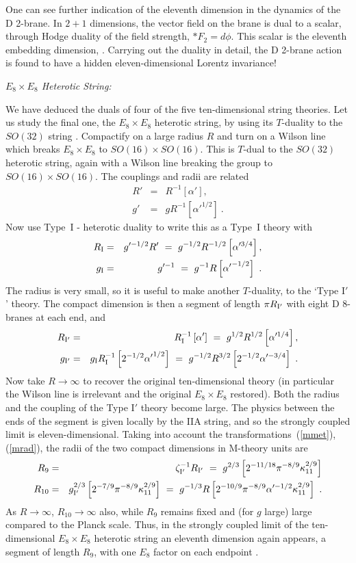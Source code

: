 \documentclass[12pt]{article}
\def\bea{\begin{eqnarray}}
\def\eea{\end{eqnarray}}
\def\ap{\alpha'}
\def\apm{\alpha'}
\begin{document}
One can see further indication of the eleventh dimension in the dynamics
of the D 2-brane.  In $2+1$ dimensions, the vector field on the brane is
dual to a scalar, through Hodge duality of the field strength, $*F_2 =
d\phi$.  This scalar is the eleventh embedding 
dimension\cite{duff11}, \cite{towndf}.
Carrying out the duality in detail, the D 2-brane action is found to have
a hidden eleven-dimensional Lorentz invariance!

{\it $E_8 \times E_8$ Heterotic String:}

We have deduced the duals of four of the five ten-dimensional string
theories.  Let us study the final one, the $E_8 \times E_8$ heterotic
string, by using its $T$-duality to the $SO(32)$ string \cite{narain}.
Compactify on a large radius $R$ and turn on a Wilson line which breaks
$E_8\times E_8$ to $SO(16) \times SO(16)$.  This is $T$-dual to the $SO(32)$
heterotic string, again with a Wilson line breaking the group to 
$SO(16) \times SO(16)$.  The couplings and radii are related
\bea
R' &=& R^{-1} \left[ \apm \right] , \nonumber\\
g' &=& g R^{-1} \left[ {\ap}^{1/2} \right] \ .
\eea
Now use Type~I - heterotic duality to write this as a Type~I theory
with \cite{wit}
\bea
R_{\rm I} &=& g'^{-1/2} R'\ =\ g^{-1/2} R^{-1/2} \left[ \apm^{3/4} \right],
\nonumber\\ 
g_{\rm I} &=& g'^{-1}\ =\ g^{-1} R \left[ {\ap}^{-1/2} \right]\ .
\eea
The radius is very small, so it is useful to make another $T$-duality, to
the `Type I$'$' theory.  The compact dimension is then a segment
of length $\pi R_{\rm I'}$ with
eight D 8-branes at each end, and
\bea
R_{\rm I'} &=& R_{\rm I}^{-1} \left[ \apm \right] \ =\ g^{1/2}
R^{1/2} \left[  \apm^{1/4} \right], 
\nonumber\\
g_{\rm I'} &=& g_{\rm I} R_{\rm I}^{-1} \left[ 2^{-1/2} {\ap}^{1/2} \right]\ =\
g^{-1/2} R^{3/2} \left[ 2^{-1/2} \apm^{-3/4} \right]\ .
\eea
Now take $R \to \infty$ to recover the original ten-dimensional theory
(in particular the Wilson line is irrelevant and the original $E_8\times
E_8$ restored).  Both the radius and the coupling of the Type I$'$ theory
become large.  The physics between the ends of the segment is given locally
by the IIA string, and so the strongly coupled limit is
eleven-dimensional.  Taking into account the transformations~(\ref{mmet}),
(\ref{mrad}), the radii of the two compact dimensions in M-theory units are
\bea
R_9 &=& \zeta_{\rm I'}^{-1} R_{\rm I'}\ =\ 
g^{2/3} \left[2^{-11/18} \pi^{-8/9} \kappa_{11}^{2/9} \right]\label{r910}
\\ 
R_{10} &=&
g_{\rm I'}^{2/3} \left[2^{-7/9} \pi^{-8/9} \kappa_{11}^{2/9} \right]
\ =\ 
g^{-1/3} R \left[2^{-10/9} \pi^{-8/9} \ap^{-1/2} \kappa_{11}^{2/9} \right]\ .  
\nonumber
\eea
As $R\to \infty$, $R_{10} \to\infty$ also, while $R_9$ remains fixed and
(for $g$ large) large compared to the Planck scale.  Thus, in the strongly
coupled limit of the ten-dimensional $E_8\times E_8$ heterotic string an
eleventh dimension again appears, a segment of length $R_9$,
with one $E_8$ factor on each endpoint \cite{horwit}.
\end{document}
